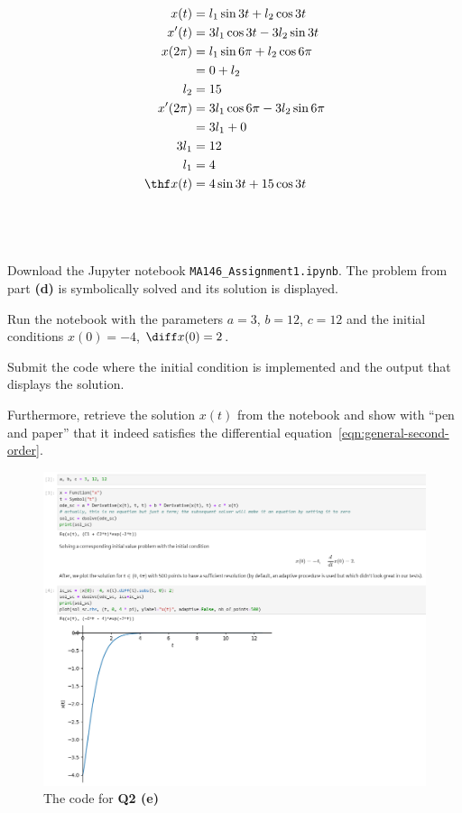 \documentclass[a4paper]{article}
\begin{document}
\begin{align*}
x(t) &= l_1 \sin 3t + l_2 \cos 3t \\
x'(t) &= 3 l_1 \cos 3t - 3 l_2 \sin 3t \\
x(2\pi) &= l_1 \sin 6\pi + l_2 \cos 6\pi \\
&= 0 + l_2 \\
l_2 &= 15 \\
x'(2\pi) &= 3 l_1 \cos 6\pi - 3 l_2 \sin 6\pi \\
&= 3 l_1 + 0 \\
3 l_1 &= 12 \\
l_1 &= 4 \\
\thf x(t) &= 4 \sin 3t + 15 \cos 3t
\end{align*}

\subsection{~} %

\begin{questionbody}
Download the Jupyter notebook \texttt{MA146\_Assignment1.ipynb}. The problem from part \textbf{(d)} is symbolically solved and its solution is displayed.

Run the notebook with the parameters $a = 3$, $b = 12$, $c = 12$ and the initial conditions $x(0) = -4$, $\diff x(0) = 2$.

Submit the code where the initial condition is implemented and the output that displays the solution.

Furthermore, retrieve the solution $x(t)$ from the notebook and show with \enquote{pen and paper} that it indeed satisfies the differential equation~\eqref{eqn:general-second-order}.
\end{questionbody}

\begin{figure}[hbtp]
    \centering
    \includegraphics[width=\linewidth]{Q2-e}
    \caption{The code for \textbf{Q2 (e)}}
\end{figure}
\end{document}
